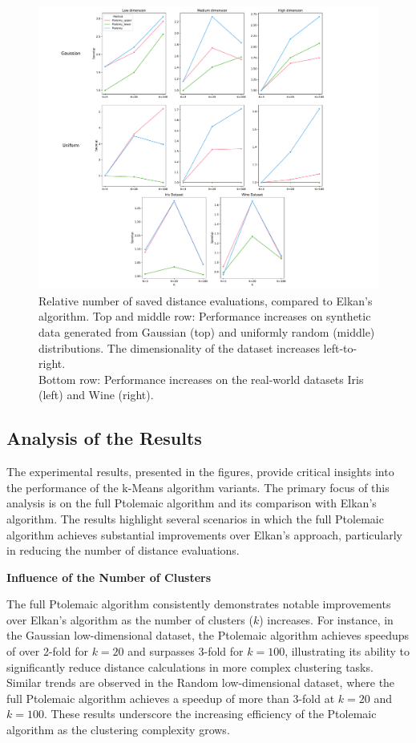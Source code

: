 \begin{figure}
	\centering
	\includegraphics[width=\textwidth]{fig/combined_plot.pdf}
	\caption{
		Relative number of saved distance evaluations, compared to Elkan's algorithm.
		Top and middle row: Performance increases on synthetic data generated from Gaussian (top) and uniformly random (middle) distributions.
		The dimensionality of the dataset increases left-to-right.\\
		Bottom row: Performance increases on the real-world datasets Iris (left) and Wine (right).
	}
	\label{fig:combined}
\end{figure}


\subsection{Analysis of the Results}

The experimental results, presented in the figures, provide critical insights into the performance of the k-Means algorithm variants. The primary focus of this analysis is on the full Ptolemaic algorithm and its comparison with Elkan’s algorithm. The results highlight several scenarios in which the full Ptolemaic algorithm achieves substantial improvements over Elkan’s approach, particularly in reducing the number of distance evaluations.

\textbf{Influence of the Number of Clusters}

The full Ptolemaic algorithm consistently demonstrates notable improvements over Elkan’s algorithm as the number of clusters ($k$) increases. For instance, in the Gaussian low-dimensional dataset, the Ptolemaic algorithm achieves speedups of over 2-fold for $k = 20$ and surpasses 3-fold for $k = 100$, illustrating its ability to significantly reduce distance calculations in more complex clustering tasks. Similar trends are observed in the Random low-dimensional dataset, where the full Ptolemaic algorithm achieves a speedup of more than 3-fold at $k = 20$ and $k = 100$. These results underscore the increasing efficiency of the Ptolemaic algorithm as the clustering complexity grows.

